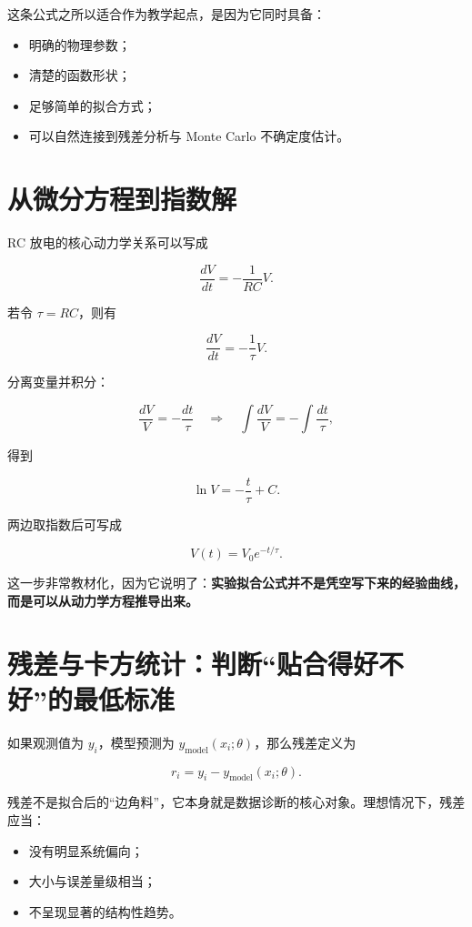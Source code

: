 这条公式之所以适合作为教学起点，是因为它同时具备：

\begin{itemize}
    \item 明确的物理参数；
    \item 清楚的函数形状；
    \item 足够简单的拟合方式；
    \item 可以自然连接到残差分析与 Monte Carlo 不确定度估计。
\end{itemize}

\section{从微分方程到指数解}

RC 放电的核心动力学关系可以写成

\[
\frac{dV}{dt} = -\frac{1}{RC}V.
\]

若令 $\tau = RC$，则有

\[
\frac{dV}{dt} = -\frac{1}{\tau}V.
\]

分离变量并积分：

\[
\frac{dV}{V} = -\frac{dt}{\tau}
\quad \Longrightarrow \quad
\int \frac{dV}{V} = -\int \frac{dt}{\tau},
\]

得到

\[
\ln V = -\frac{t}{\tau} + C.
\]

两边取指数后可写成

\[
V(t) = V_0 e^{-t/\tau}.
\]

这一步非常教材化，因为它说明了：\textbf{实验拟合公式并不是凭空写下来的经验曲线，而是可以从动力学方程推导出来。}

\section{残差与卡方统计：判断“贴合得好不好”的最低标准}

如果观测值为 $y_i$，模型预测为 $y_{\mathrm{model}}(x_i;\theta)$，那么残差定义为

\[
r_i = y_i - y_{\mathrm{model}}(x_i;\theta).
\]

残差不是拟合后的“边角料”，它本身就是数据诊断的核心对象。理想情况下，残差应当：

\begin{itemize}
    \item 没有明显系统偏向；
    \item 大小与误差量级相当；
    \item 不呈现显著的结构性趋势。
\end{itemize}

